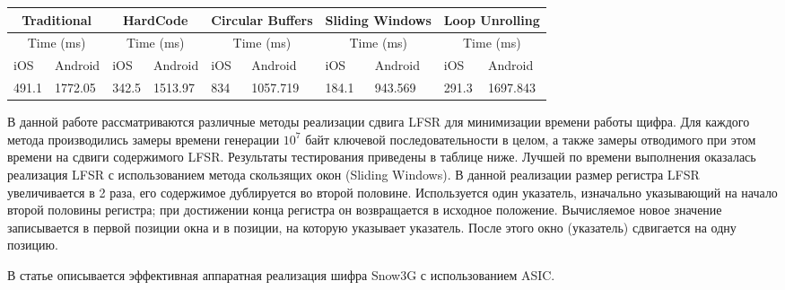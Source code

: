 \documentclass{./civarticle}
\begin{document}
\begin{longtable}{|p{1cm}|p{1cm}|p{1cm}|p{1cm}|p{1cm}|p{1cm}|p{1cm}|p{1cm}|p{1cm}|p{1cm}|}
\hline
\multicolumn{2}{|c|}{Traditional} & \multicolumn{2}{c|}{HardCode} & \multicolumn{2}{c|}{Circular Buffers} & \multicolumn{2}{c|}{Sliding Windows} & \multicolumn{2}{c|}{Loop Unrolling} \\
\hline
\multicolumn{2}{|c|}{Time (ms)} & \multicolumn{2}{c|}{Time (ms)} & \multicolumn{2}{c|}{Time (ms)} & \multicolumn{2}{c|}{Time (ms)} & \multicolumn{2}{c|}{Time (ms)} \\
\hline
iOS & Android & iOS & Android & iOS & Android & iOS & Android & iOS & Android \\
\hline
491.1 & 1772.05 & 342.5 & 1513.97 & 834 & 1057.719 & 184.1 & 943.569 & 291.3 & 1697.843 \\
\hline
\end{longtable}

В данной работе рассматриваются различные методы реализации сдвига LFSR для минимизации времени работы щифра. Для каждого метода производились замеры времени генерации $10^7$ байт ключевой последовательности в целом, а также замеры отводимого при этом времени на сдвиги содержимого LFSR. Результаты тестирования приведены в таблице ниже. Лучшей по времени выполнения оказалась реализация LFSR с использованием метода скользящих окон (Sliding Windows). В данной реализации размер регистра LFSR увеличивается в 2 раза, его содержимое дублируется во второй половине. Используется один указатель, изначально указывающий на начало второй половины регистра; при достижении конца регистра он возвращается в исходное положение. Вычисляемое новое значение записывается в первой позиции окна и в позиции, на которую указывает указатель. После этого окно (указатель) сдвигается на одну позицию.

В статье \cite{art3} описывается эффективная аппаратная реализация шифра Snow3G с использованием ASIC.

\begin{figure}[h]
\end{figure}
\end{document}
